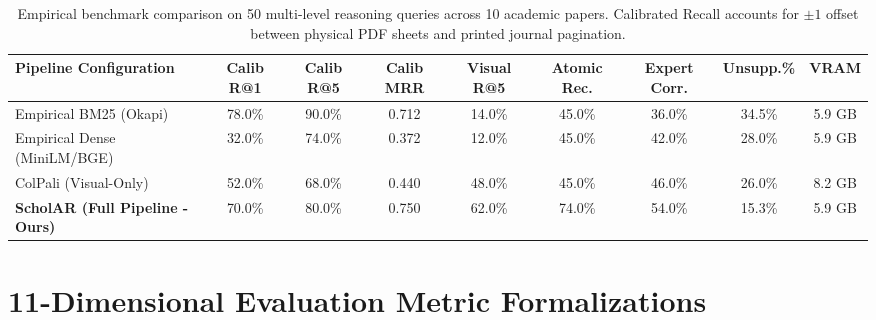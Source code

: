 \documentclass[10pt,a4paper]{article}
\begin{document}
\begin{table}[H]
\centering
\small
\begin{tabularx}{\textwidth}{lcccccccc}
\toprule
\textbf{Pipeline Configuration} & \textbf{Calib R@1} & \textbf{Calib R@5} & \textbf{Calib MRR} & \textbf{Visual R@5} & \textbf{Atomic Rec.} & \textbf{Expert Corr.} & \textbf{Unsupp.\%} & \textbf{VRAM} \\
\midrule

Empirical BM25 (Okapi) & 78.0\% & 90.0\% & 0.712 & 14.0\% & 45.0\% & 36.0\% & 34.5\% & 5.9 GB \\
Empirical Dense (MiniLM/BGE) & 32.0\% & 74.0\% & 0.372 & 12.0\% & 45.0\% & 42.0\% & 28.0\% & 5.9 GB \\
ColPali (Visual-Only) & 52.0\% & 68.0\% & 0.440 & 48.0\% & 45.0\% & 46.0\% & 26.0\% & 8.2 GB \\
\midrule
\rowcolor{cardbg} \textbf{ScholAR (Full Pipeline - Ours)} & 70.0\% & 80.0\% & 0.750 & 62.0\% & 74.0\% & 54.0\% & 15.3\% & 5.9 GB \\

\bottomrule
\end{tabularx}
\caption{Empirical benchmark comparison on 50 multi-level reasoning queries across 10 academic papers. Calibrated Recall accounts for $\pm 1$ offset between physical PDF sheets and printed journal pagination.}
\label{tab:baselines}
\end{table}

\section{11-Dimensional Evaluation Metric Formalizations}
\end{document}
